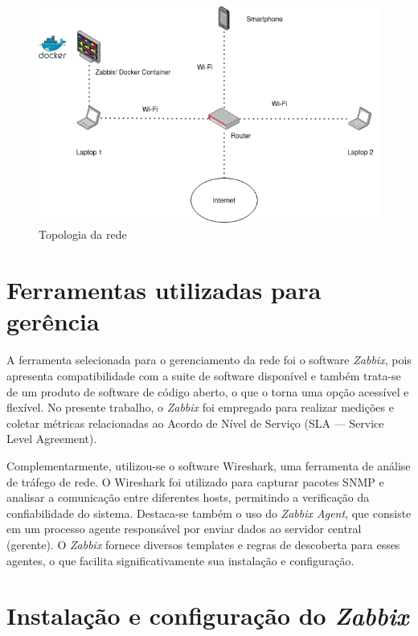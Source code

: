\documentclass[12pt]{article}
\begin{document}
\begin{figure}[h!]
\centerline{\includegraphics[totalheight=6cm]{topologia.png}}
  \caption{Topologia da rede}
  \label{fig:topologia}
\end{figure}

\section{Ferramentas utilizadas para gerência}
\paragraph{}
A ferramenta selecionada para o gerenciamento da rede foi o software \textit{Zabbix}, pois apresenta compatibilidade com
a suite de software disponível e também trata-se de um produto de software de código aberto, o que o torna uma opção
acessível e flexível. No presente trabalho, o \textit{Zabbix} foi empregado para realizar medições e coletar métricas
relacionadas ao Acordo de Nível de Serviço (SLA --- Service Level Agreement).

Complementarmente, utilizou-se o software Wireshark, uma ferramenta de análise de tráfego de rede. O Wireshark foi
utilizado para capturar pacotes SNMP e analisar a comunicação entre diferentes hosts, permitindo a verificação da
confiabilidade do sistema. Destaca-se também o uso do \textit{Zabbix Agent}, que consiste em um processo agente responsável por
enviar dados ao servidor central (gerente). O \textit{Zabbix} fornece diversos templates e regras de descoberta para esses agentes,
o que facilita significativamente sua instalação e configuração.

\section{Instalação e configuração do \textit{Zabbix}}
\end{document}

